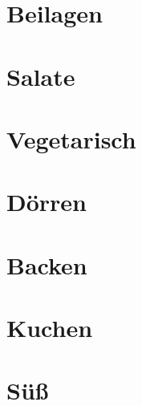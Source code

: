 \documentclass[11pt, DIV=15, twoside=false]{scrbook}
\begin{document}
\part{Beilagen}


\part{Salate}


\part{Vegetarisch}




\part{Dörren}


\part{Backen}






\part{Kuchen}





\part{Süß}








	
\end{document}
